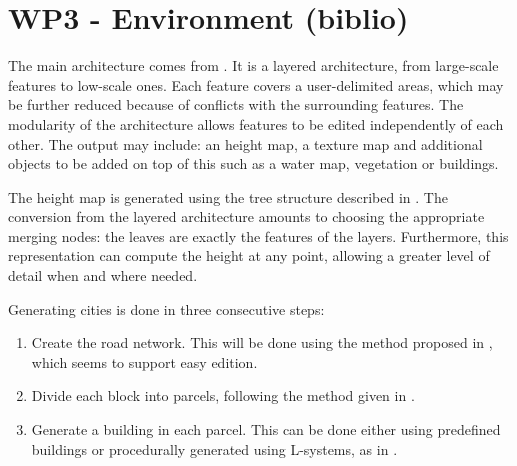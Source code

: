 \section{WP3 - Environment (biblio)}

The main architecture comes from \cite{DeclarativeArchitecture}. It is a
layered architecture, from large-scale features to low-scale ones. Each feature
covers a user-delimited areas, which may be further reduced because of
conflicts with the surrounding features. The modularity of the architecture
allows features to be edited independently of each other. The output may
include: an height map, a texture map and additional objects to be added on top
of this such as a water map, vegetation or buildings.

The height map is generated using the tree structure described in
\cite{FeatureTree}. The conversion from the layered architecture amounts to
choosing the appropriate merging nodes: the leaves are exactly the features of
the layers. Furthermore, this representation can compute the height at any
point, allowing a greater level of detail when and where needed.

Generating cities is done in three consecutive steps: \begin{enumerate}
  \item Create the road network. This will be done using the method proposed in
    \cite{StreetTensors}, which seems to support easy edition.
  \item Divide each block into parcels, following the method given in
    \cite{PGParcels}.
  \item Generate a building in each parcel. This can be done either using
    predefined buildings or procedurally generated using L-systems, as in
    \cite{FLSystem}.
\end{enumerate}
